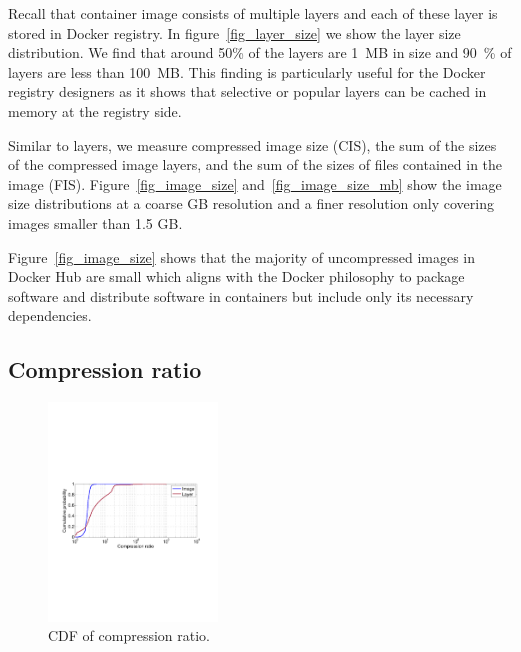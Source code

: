 Recall that container image consists of multiple layers and each of these layer
is stored in Docker registry.  In figure~\ref{fig_layer_size} we show the layer
size distribution. We find that around 50\% of the layers are 1~MB in size and
90~\% of layers are less than 100~MB. This finding is particularly useful for
the Docker registry designers as it shows that selective or popular layers can
be cached in memory at the registry side.

Similar to layers, we measure compressed image size (CIS), \ie the sum of the
sizes of the compressed image layers, and the sum of the sizes of files
contained in the image (FIS). Figure~\ref{fig_image_size}
and~\ref{fig_image_size_mb} show the image size distributions at a coarse GB
resolution and a finer resolution only covering images smaller than 1.5 GB.

Figure~\ref{fig_image_size} shows that the majority of uncompressed images in
Docker Hub are small which aligns with the Docker philosophy to package
software and distribute software in containers but include only its necessary
dependencies.

\subsection{Compression ratio}
\begin{figure}
	\centering
	\includegraphics[width=0.4\textwidth]{graphs/compress-ratio-cdf.pdf}
	\caption{CDF of compression ratio.
	}
	\label{fig:compress-ratio}
\end{figure}

